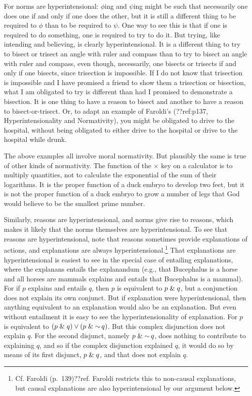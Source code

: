 For norms are hyperintensional: $\phi$ing and $\psi$ing might be such that necessarily one does one if and only if one does the other,
but it is still a different thing to be required to $\phi$ than to be required to $\psi$. One way to see this is that if one
is required to do something, one is required to try to do it. But trying, like intending and believing, is clearly hyperintensional.
It is a different thing to try to bisect or trisect an angle with ruler and compass than to try to bisect an angle with ruler and 
compass, even though, necessarily, one bisects or trisects if and only if one bisects, since trisection is impossible. If I do not
know that trisection is impossible and I have promised a friend to show them a trisection or bisection, what I am obligated to try
is different than had I promised to demonstrate a bisection. 
It is one thing to have a reason to bisect and another to have a reason to bisect-or-trisect. Or, to adapt an example of 
Faroldi's (??ref:p137, Hyperintensionality
and Normativity), you might be obligated to drive to the hospital, without being obligated to either drive to the hospital or 
drive to the hospital while drunk. 

The above examples all involve moral normativity. But plausibly the same is true of other kinds of normativity. The function of the
$\times$ key on a calculator is to multiply quantities, not to calculate the exponential of the sum of their logarithms. It is 
the proper function of a duck embryo to develop two feet, but  it is not the proper function of a duck embryo to grow a
number of legs that God would believe to be the smallest prime number.

Similarly, reasons are hyperintensional, and norms give rise to reasons, which makes it likely that the norms themselves are
hyperintensional. To see that reasons are hyperintensional, note that reasons sometimes provide explanations of actions, and 
explanations are always hyperintensional.\footnote{Cf. Faroldi (p.~139)??ref. Faroldi restricts this to non-causal explanations, but
causal explanations are also hyperintensional by our argument below.}
 That explanations are hyperintensional is easiest to see in the special case of entailing
explanations, where the explanans entails the explanandum (e.g., that Bucephalus is a horse and all horses are mammals explains
and entails that Bucephalus is a mammal). For if $p$ explains and entails $q$, then $p$ is equivalent to $p\mathrel{\&} q$, but a 
conjunction does not explain its own conjunct. But if explanation were hyperintensional, then anything equivalent to an 
explanation would also be an explanation. But even without entailment it is easy to see the hyperintensionality of
explanation. For $p$ is equivalent to $(p\mathrel{\&} q)\vee (p\mathrel{\&}\operatorname{\sim} q)$. But this complex disjunction does not explain $q$. 
For the second disjunct, namely $p\mathrel{\&}\operatorname{\sim} q$, does nothing to contribute to explaining $q$, and so if the complex disjunction 
explained $q$, it would do so by means of its first disjunct, $p\mathrel{\&} q$, and that does not explain $q$. 

